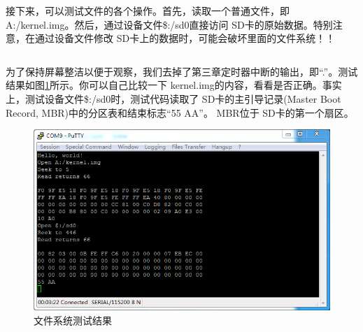 \documentclass[main.tex]{subfiles}
\begin{document}
\begin{CJK*}{UTF8}{song}
\begin{code}
\label{code:6-9}
\inputminted[firstline=516,lastline=531,linenos,numbersep=5pt,frame=lines,framesep=2mm]{c}{src/chapter06/kernel/machdep.c}
\end{code}

接下来，可以测试文件的各个操作。首先，读取一个普通文件，即 A:/kernel.img。然后，通过设备文件\$:/sd0直接访问 SD卡的原始数据。特别注意，在通过设备文件修改 SD卡上的数据时，可能会破坏里面的文件系统！！

\begin{code}
\label{code:6-10}
\inputminted[firstline=533,lastline=576,linenos,numbersep=5pt,frame=lines,framesep=2mm]{c}{src/chapter06/kernel/machdep.c}
\end{code}

为了保持屏幕整洁以便于观察，我们去掉了第三章定时器中断的输出，即“.”。测试结果如图\ref{figure:6-1}所示。你可以自己比较一下 kernel.img的内容，看看是否正确。事实上，测试设备文件\$:/sd0时，测试代码读取了 SD卡的主引导记录(Master Boot Record, MBR)中的分区表和结束标志“55 AA”。 MBR位于 SD卡的第一个扇区。

\begin{figure}[htp]
\centering
\includegraphics[scale=0.4]{figures/6-1}
\caption{文件系统测试结果}
\label{figure:6-1}
\end{figure}

\clearpage
\ifxetex\else\end{CJK*}\fi
\end{document}

